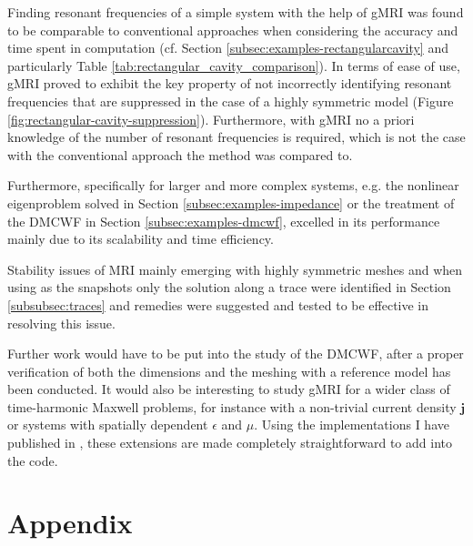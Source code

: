 \documentclass[11pt, a4paper]{article}
\begin{document}
Finding resonant frequencies of a simple system with the help of \acrshort{gMRI} was found to 
be comparable to conventional approaches when considering the accuracy and
time spent in computation (cf. Section \ref{subsec:examples-rectangularcavity}
and particularly Table \ref{tab:rectangular_cavity_comparison}). In terms of
ease of use, \acrshort{gMRI} proved to exhibit the key property of not incorrectly
identifying resonant frequencies that are suppressed in the case of a highly
symmetric model (Figure \ref{fig:rectangular-cavity-suppression}). Furthermore,
with \acrshort{gMRI} no a priori knowledge of the number of resonant frequencies
is required, which is not the case with the conventional approach the method was
compared to.

Furthermore, specifically for larger and more complex systems, e.g.
the nonlinear eigenproblem solved in Section \ref{subsec:examples-impedance}
or the treatment of the \acrfull{DMCWF} in Section \ref{subsec:examples-dmcwf},
excelled in its performance mainly due to its scalability and time efficiency.

Stability issues of \acrshort{MRI} mainly emerging with highly symmetric meshes
and when using as the snapshots only the solution along a trace
were identified
in Section \ref{subsubsec:traces} and remedies were suggested and tested to be
effective in resolving this issue.

Further work would have to be put into the study of the \acrshort{DMCWF}, after
a proper verification of both the dimensions and the meshing with a reference
model has been conducted. It would also be interesting to study \acrshort{gMRI}
for a wider class of time-harmonic Maxwell problems, for instance with a non-trivial
current density $\mathbf{j}$ or systems with spatially dependent $\epsilon$ and
$\mu$. Using the implementations I have published in \cite{git}, these extensions
are made completely straightforward to add into the code.

\newpage


\newpage
\section*{Appendix}
\label{sec:appendix}
\end{document}
